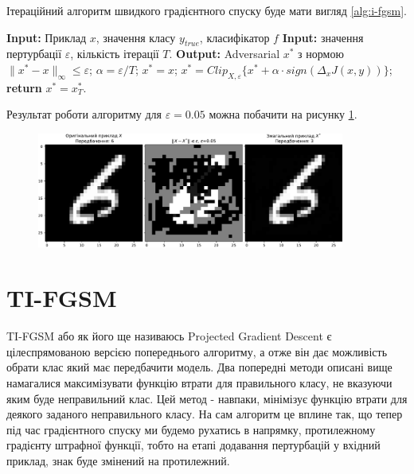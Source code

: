 \documentclass[a4paper,14pt]{extreport}
\renewcommand{\algorithmicrequire}{\textbf{Input: }}
\renewcommand{\algorithmicensure}{\textbf{Output: }}
\newcommand{\algorithmreturn}{\textbf{return }}
\begin{document}
	Ітераційний алгоритм швидкого градієнтного спуску буде мати вигляд \ref{alg:i-fgsm}.
	\begin{algorithm}
		\caption{$I-FGSM$}
		\label{alg:i-fgsm}
		\begin{algorithmic}[1]
			\State \algorithmicrequire{Приклад $x$, значення класу $y_{true}$, класифікатор $f$}
			\State \algorithmicrequire{значення пертурбації $\varepsilon$, кількість ітерації $T$.}
			\State \algorithmicensure{ Adversarial $x^{*}$ з нормою $\|x^{*} - x\|_{\infty} \leq \varepsilon $;}
			\State $\alpha = \varepsilon / T $;
			\State $x^{*} = x$;
			\State $x^{*} = Clip_{X, \varepsilon} \big\{ x^{*} + \alpha \cdot  sign(\Delta_x J(x, y)) \big\}$;
			\EndFor
			\State \algorithmreturn{$x^{*} = x^{*}_{T}$}.
		\end{algorithmic}
	\end{algorithm}
	
	Результат роботи алгоритму для $\varepsilon = 0.05$ можна побачити на рисунку \ref{fig:i-fgsm-example}.
	\begin{figure}[h]
		\centering
		\includegraphics[width=0.9\textwidth]{resources/i-fgsm-example.pdf}
		\caption{}
		\label{fig:i-fgsm-example}
	\end{figure}
		
	\newpage
	\section{TI-FGSM}
	TI-FGSM або як його ще називаюсь Projected Gradient Descent є цілеспрямованою версією попереднього алгоритму, а отже він дає можливість обрати клас який має передбачити модель. Два попередні методи описані вище намагалися максимізувати функцію втрати для правильного класу, не вказуючи яким буде неправильний клас. Цей метод - навпаки, мінімізує функцію втрати для деякого заданого неправильного класу. На сам алгоритм це вплине так, що тепер під час градієнтного спуску ми будемо рухатись в напрямку, протилежному градієнту штрафної функції, тобто на етапі додавання пертурбацій у вхідний приклад, знак буде змінений на протилежний.
\end{document}

